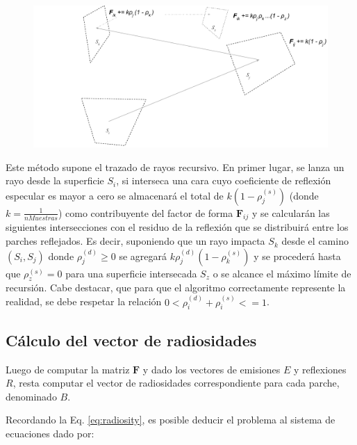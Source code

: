 \vspace{5mm}
\begin{figure}[htbp!]
	\includegraphics[width=1\linewidth]{assets/extended}
	\label{img:caminoespecular}
\end{figure}

Este método supone el trazado de rayos recursivo. En primer lugar, se lanza un rayo desde la superficie $S_{i}$, si  interseca una cara cuyo coeficiente de reflexión especular es mayor a cero se almacenará el total de $k(1 - \rho^{(s)}_{j})$ (donde $k = \frac{1}{nMuestras}$) como contribuyente del factor de forma $\mathbf{F}_{ij}$ y se calcularán las siguientes intersecciones con el residuo de la reflexión que se distribuirá entre los parches reflejados. Es decir, suponiendo que un rayo impacta $S_{k}$ desde el camino $(S_{i}, S_{j})$ donde $\rho^{(d)}_{j} \ge 0$ se agregará $k\rho^{(d)}_{j}(1 - \rho^{(s)}_{k})$ y se procederá hasta que $\rho^{(s)}_{z} = 0$ para una superficie intersecada $S_{z}$ o se alcance el máximo límite de recursión. Cabe destacar, que para que el algoritmo correctamente represente la realidad, se debe respetar la relación $0 < \rho^{(d)}_{i} + \rho^{(s)}_{i} <= 1$.

\subsection{Cálculo del vector de radiosidades}
\label{sec:vrad}

Luego de computar la matriz $\mathbf{F}$ y dado los vectores de emisiones $E$ y reflexiones $R$, resta computar el vector de radiosidades correspondiente para cada parche, denominado $B$.

Recordando la Eq. \eqref{eq:radiosity}, es posible deducir el problema al sistema de ecuaciones dado por:

